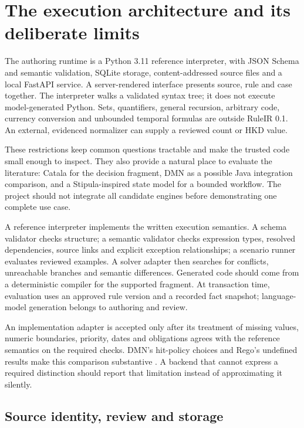 \documentclass[12pt,a4paper,oneside,openany]{book}
\begin{document}
\section{The execution architecture and its deliberate limits}
\label{merge:P-03-product:07}


The authoring runtime is a Python 3.11 reference interpreter, with JSON Schema and
semantic validation, SQLite storage, content-addressed source files and a local
FastAPI service. A server-rendered interface presents source, rule and case
together. The interpreter walks a validated syntax tree; it does not execute
model-generated Python. Sets, quantifiers, general recursion, arbitrary code,
currency conversion and unbounded temporal formulas are outside RuleIR 0.1.
An external, evidenced normalizer can supply a reviewed count or HKD value.

These restrictions keep common questions tractable and make the trusted code
small enough to inspect. They also provide a natural place to evaluate the
literature: Catala for the decision fragment, DMN as a possible Java integration comparison,
and a Stipula-inspired state model for a bounded workflow. The project should not
integrate all candidate engines before demonstrating one complete use case.

A reference interpreter implements the written execution semantics. A schema
validator checks structure; a semantic validator checks expression types,
resolved dependencies,
source links and explicit exception relationships; a scenario runner evaluates
reviewed examples. A solver adapter then searches for conflicts, unreachable
branches and semantic differences. Generated code should come from a deterministic
compiler for the supported fragment. At transaction time, evaluation uses an
approved rule version and a recorded fact snapshot; language-model generation
belongs to authoring and review.

An implementation adapter is accepted only after its treatment of missing
values, numeric boundaries, priority, dates and obligations agrees with the
reference semantics on the required checks. DMN's hit-policy choices and Rego's
undefined results make this comparison substantive
\citep{dmn2024,opadocs}. A backend that cannot express a required distinction
should report that limitation instead of approximating it silently.

\subsection{Source identity, review and storage}
\label{merge:P-03c-storage-review:00}
\end{document}
